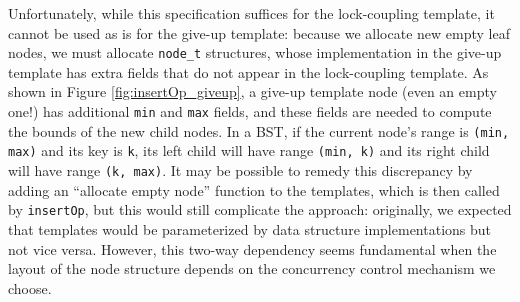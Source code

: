 \documentclass[a4paper,UKenglish,cleveref, autoref, thm-restate]{lipics-v2021}
\newcommand{\treerep}{\ensuremath{\mathsf{Node}}}
\newcommand{\nodeboxrep}{\ensuremath{\mathsf{Node\_ref}}}
\newcommand{\infp}{\ensuremath{\mathsf{InFP}}}
\begin{document}
Unfortunately, while this specification suffices for the lock-coupling template, it cannot be used as is for the give-up template: because we allocate new empty leaf nodes, we must allocate \lstinline{node_t} structures, whose implementation in the give-up template has extra fields that do not appear in the lock-coupling template. As shown in Figure \ref{fig:insertOp_giveup}, a give-up template node (even an empty one!) has additional \lstinline{min} and \lstinline{max} fields, and these fields are needed to compute the bounds of the new child nodes. In a BST, if the current node's range is \lstinline{(min, max)} and its key is \lstinline{k}, its left child will have range \texttt{(min, k)} and its right child will have range \texttt{(k, max)}. It may be possible to remedy this discrepancy by adding an ``allocate empty node'' function to the templates, which is then called by \lstinline{insertOp}, but this would still complicate the approach: originally, we expected that templates would be parameterized by data structure implementations but not vice versa. However, this two-way dependency seems fundamental when the layout of the node structure depends on the concurrency control mechanism we choose.



\end{document}
